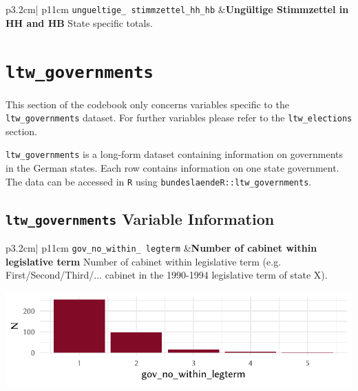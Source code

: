 \documentclass[
]{scrartcl}
\begin{document}
\begin{longtable}{p{3.2cm}| p{11cm}}
\texttt{ungueltige\_
stimmzettel\_hh\_hb} &\textbf{Ungültige Stimmzettel in HH and HB}\newline 
State specific totals.
\end{longtable}

\newpage

\hypertarget{ltw_governments}{%
\section{\texorpdfstring{\texttt{ltw\_governments}}{ltw\_governments}}\label{ltw_governments}}

This section of the codebook only concerns variables specific to the
\texttt{ltw\_governments} dataset. For further variables please refer to
the \texttt{ltw\_elections} section.

\texttt{ltw\_governments} is a long-form dataset containing information
on governments in the German states. Each row contains information on
one state government. The data can be accessed in \texttt{R} using
\texttt{bundeslaendeR::ltw\_governments}.

\hypertarget{ltw_governments-variable-information}{%
\subsection{\texorpdfstring{\texttt{ltw\_governments} Variable
Information}{ltw\_governments Variable Information}}\label{ltw_governments-variable-information}}

\begin{longtable}{p{3.2cm}| p{11cm}}
\texttt{gov\_no\_within\_
legterm} &\textbf{Number of cabinet within legislative term}\newline 
Number of cabinet within legislative term (e.g. First/Second/Third/... cabinet in the 1990-1994 legislative term of state X).



\hspace*{.25cm}
\begin{minipage}[t]{\linewidth }
\vspace{0pt}
\includegraphics[width = \linewidth]{cbfiles/govnolegperplot.pdf}
\end{minipage}



\end{longtable}
\end{document}

